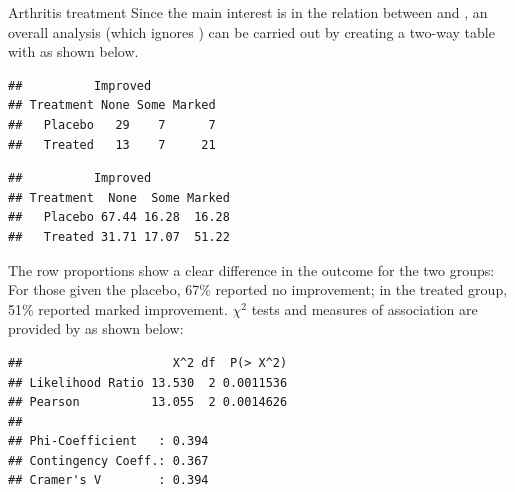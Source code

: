 \documentclass[11pt]{book}
\renewenvironment{knitrout}{\small\renewcommand{\baselinestretch}{.85}}{} %
\begin{document}
\begin{Example}[arthrit2]{Arthritis treatment}
Since the main interest is in the relation between  and
, an overall analysis (which ignores ) can be carried out
by creating a two-way table with 
as shown below.
\begin{knitrout}
\color{fgcolor}\begin{kframe}
\begin{alltt}
\hlstd{(}\hlstd{,} \hlstd{=}\hlstd{)}
 \hlkwb{<-} \hlstd{(}\hlopt{~} \hlopt{+}  
\end{alltt}
\begin{verbatim}
##          Improved
## Treatment None Some Marked
##   Placebo   29    7      7
##   Treated   13    7     21
\end{verbatim}
\begin{alltt}
\hlstd{(}\hlopt{*} \hlstd{=}\hlstd{),} \hlstd{)}
\end{alltt}
\begin{verbatim}
##          Improved
## Treatment  None  Some Marked
##   Placebo 67.44 16.28  16.28
##   Treated 31.71 17.07  51.22
\end{verbatim}
\end{kframe}
\end{knitrout}
The row proportions show a clear difference in the outcome for the two groups:
For those given the placebo, 67\% reported no improvement;
in the treated group, 51\% reported marked improvement.  $\chi^2$ tests
and measures of association are provided by  as shown below:
\begin{knitrout}
\color{fgcolor}\begin{kframe}
\begin{alltt}
\end{alltt}
\begin{verbatim}
##                     X^2 df  P(> X^2)
## Likelihood Ratio 13.530  2 0.0011536
## Pearson          13.055  2 0.0014626
## 
## Phi-Coefficient   : 0.394 
## Contingency Coeff.: 0.367 
## Cramer's V        : 0.394
\end{verbatim}
\end{kframe}
\end{knitrout}
\end{Example}
\end{document}
